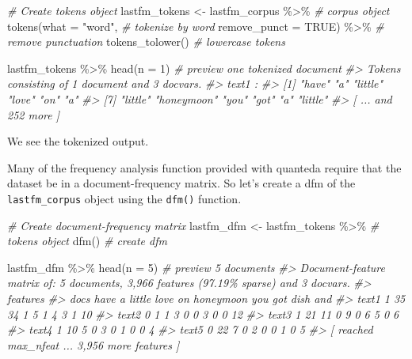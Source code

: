 \documentclass[
]{article}
\newenvironment{Shaded}{\begin{snugshade}}{\end{snugshade}}
\newcommand{\AttributeTok}[1]{\textcolor[rgb]{0.77,0.63,0.00}{#1}}
\newcommand{\CommentTok}[1]{\textcolor[rgb]{0.56,0.35,0.01}{\textit{#1}}}
\newcommand{\ConstantTok}[1]{\textcolor[rgb]{0.00,0.00,0.00}{#1}}
\newcommand{\DecValTok}[1]{\textcolor[rgb]{0.00,0.00,0.81}{#1}}
\newcommand{\FunctionTok}[1]{\textcolor[rgb]{0.00,0.00,0.00}{#1}}
\newcommand{\NormalTok}[1]{#1}
\newcommand{\OtherTok}[1]{\textcolor[rgb]{0.56,0.35,0.01}{#1}}
\newcommand{\SpecialCharTok}[1]{\textcolor[rgb]{0.00,0.00,0.00}{#1}}
\newcommand{\StringTok}[1]{\textcolor[rgb]{0.31,0.60,0.02}{#1}}
\begin{document}
\begin{Shaded}
\begin{Highlighting}[]
\CommentTok{\# Create tokens object}
\NormalTok{lastfm\_tokens }\OtherTok{\textless{}{-}} 
\NormalTok{  lastfm\_corpus }\SpecialCharTok{\%\textgreater{}\%} \CommentTok{\# corpus object}
  \FunctionTok{tokens}\NormalTok{(}\AttributeTok{what =} \StringTok{"word"}\NormalTok{, }\CommentTok{\# tokenize by word}
         \AttributeTok{remove\_punct =} \ConstantTok{TRUE}\NormalTok{) }\SpecialCharTok{\%\textgreater{}\%} \CommentTok{\# remove punctuation}
  \FunctionTok{tokens\_tolower}\NormalTok{() }\CommentTok{\# lowercase tokens}

\NormalTok{lastfm\_tokens }\SpecialCharTok{\%\textgreater{}\%} 
  \FunctionTok{head}\NormalTok{(}\AttributeTok{n =} \DecValTok{1}\NormalTok{) }\CommentTok{\# preview one tokenized document}
\CommentTok{\#\textgreater{} Tokens consisting of 1 document and 3 docvars.}
\CommentTok{\#\textgreater{} text1 :}
\CommentTok{\#\textgreater{}  [1] "have"      "a"         "little"    "love"      "on"        "a"        }
\CommentTok{\#\textgreater{}  [7] "little"    "honeymoon" "you"       "got"       "a"         "little"   }
\CommentTok{\#\textgreater{} [ ... and 252 more ]}
\end{Highlighting}
\end{Shaded}

We see the tokenized output.

Many of the frequency analysis function provided with quanteda require that the dataset be in a document-frequency matrix. So let's create a dfm of the \texttt{lastfm\_corpus} object using the \texttt{dfm()} function.

\begin{Shaded}
\begin{Highlighting}[]
\CommentTok{\# Create document{-}frequency matrix}
\NormalTok{lastfm\_dfm }\OtherTok{\textless{}{-}} 
\NormalTok{  lastfm\_tokens }\SpecialCharTok{\%\textgreater{}\%} \CommentTok{\# tokens object}
  \FunctionTok{dfm}\NormalTok{() }\CommentTok{\# create dfm}

\NormalTok{lastfm\_dfm }\SpecialCharTok{\%\textgreater{}\%} 
  \FunctionTok{head}\NormalTok{(}\AttributeTok{n =} \DecValTok{5}\NormalTok{) }\CommentTok{\# preview 5 documents}
\CommentTok{\#\textgreater{} Document{-}feature matrix of: 5 documents, 3,966 features (97.19\% sparse) and 3 docvars.}
\CommentTok{\#\textgreater{}        features}
\CommentTok{\#\textgreater{} docs    have  a little love on honeymoon you got dish and}
\CommentTok{\#\textgreater{}   text1    1 35     34    1  5         1   4   3    1  10}
\CommentTok{\#\textgreater{}   text2    0  1      1    3  0         0   3   0    0  12}
\CommentTok{\#\textgreater{}   text3    1 21     11    0  9         0   6   5    0   6}
\CommentTok{\#\textgreater{}   text4    1 10      5    0  3         0   1   0    0   4}
\CommentTok{\#\textgreater{}   text5    0 22      7    0  2         0   0   1    0   5}
\CommentTok{\#\textgreater{} [ reached max\_nfeat ... 3,956 more features ]}
\end{Highlighting}
\end{Shaded}
\end{document}
